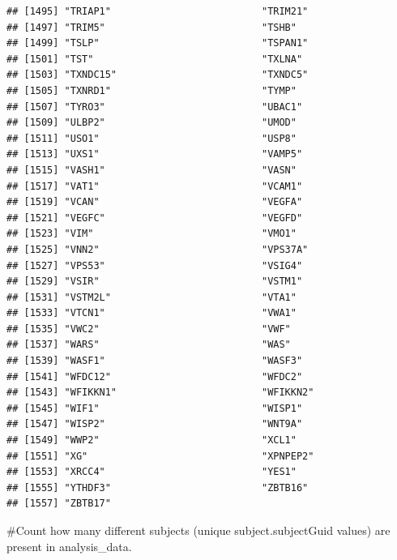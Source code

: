 \documentclass[
]{article}
\begin{document}
\begin{verbatim}
## [1495] "TRIAP1"                          "TRIM21"                         
## [1497] "TRIM5"                           "TSHB"                           
## [1499] "TSLP"                            "TSPAN1"                         
## [1501] "TST"                             "TXLNA"                          
## [1503] "TXNDC15"                         "TXNDC5"                         
## [1505] "TXNRD1"                          "TYMP"                           
## [1507] "TYRO3"                           "UBAC1"                          
## [1509] "ULBP2"                           "UMOD"                           
## [1511] "USO1"                            "USP8"                           
## [1513] "UXS1"                            "VAMP5"                          
## [1515] "VASH1"                           "VASN"                           
## [1517] "VAT1"                            "VCAM1"                          
## [1519] "VCAN"                            "VEGFA"                          
## [1521] "VEGFC"                           "VEGFD"                          
## [1523] "VIM"                             "VMO1"                           
## [1525] "VNN2"                            "VPS37A"                         
## [1527] "VPS53"                           "VSIG4"                          
## [1529] "VSIR"                            "VSTM1"                          
## [1531] "VSTM2L"                          "VTA1"                           
## [1533] "VTCN1"                           "VWA1"                           
## [1535] "VWC2"                            "VWF"                            
## [1537] "WARS"                            "WAS"                            
## [1539] "WASF1"                           "WASF3"                          
## [1541] "WFDC12"                          "WFDC2"                          
## [1543] "WFIKKN1"                         "WFIKKN2"                        
## [1545] "WIF1"                            "WISP1"                          
## [1547] "WISP2"                           "WNT9A"                          
## [1549] "WWP2"                            "XCL1"                           
## [1551] "XG"                              "XPNPEP2"                        
## [1553] "XRCC4"                           "YES1"                           
## [1555] "YTHDF3"                          "ZBTB16"                         
## [1557] "ZBTB17"
\end{verbatim}

\#Count how many different subjects (unique subject.subjectGuid values)
are present in analysis\_data.
\end{document}

